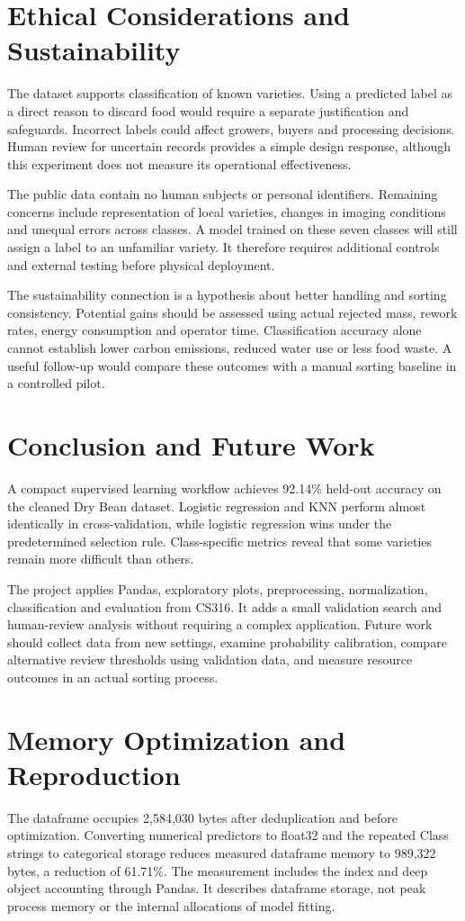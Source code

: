 \documentclass[conference]{IEEEtran}
\begin{document}
\section{Ethical Considerations and Sustainability}
The dataset supports classification of known varieties. Using a predicted label as a direct reason to discard food would require a separate justification and safeguards. Incorrect labels could affect growers, buyers and processing decisions. Human review for uncertain records provides a simple design response, although this experiment does not measure its operational effectiveness.

The public data contain no human subjects or personal identifiers. Remaining concerns include representation of local varieties, changes in imaging conditions and unequal errors across classes. A model trained on these seven classes will still assign a label to an unfamiliar variety. It therefore requires additional controls and external testing before physical deployment.

The sustainability connection is a hypothesis about better handling and sorting consistency. Potential gains should be assessed using actual rejected mass, rework rates, energy consumption and operator time. Classification accuracy alone cannot establish lower carbon emissions, reduced water use or less food waste. A useful follow-up would compare these outcomes with a manual sorting baseline in a controlled pilot.
\section{Conclusion and Future Work}
A compact supervised learning workflow achieves 92.14\% held-out accuracy on the cleaned Dry Bean dataset. Logistic regression and KNN perform almost identically in cross-validation, while logistic regression wins under the predetermined selection rule. Class-specific metrics reveal that some varieties remain more difficult than others.

The project applies Pandas, exploratory plots, preprocessing, normalization, classification and evaluation from CS316. It adds a small validation search and human-review analysis without requiring a complex application. Future work should collect data from new settings, examine probability calibration, compare alternative review thresholds using validation data, and measure resource outcomes in an actual sorting process.
\appendices
\section{Memory Optimization and Reproduction}
The dataframe occupies 2,584,030 bytes after deduplication and before optimization. Converting numerical predictors to float32 and the repeated Class strings to categorical storage reduces measured dataframe memory to 989,322 bytes, a reduction of 61.71\%. The measurement includes the index and deep object accounting through Pandas. It describes dataframe storage, not peak process memory or the internal allocations of model fitting.
\end{document}
